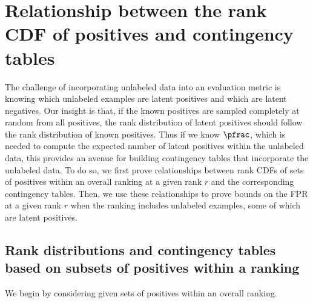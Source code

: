 \section{Relationship between the rank CDF of positives and contingency tables} \label{rank-roc}
The challenge of incorporating unlabeled data into an evaluation metric is knowing which unlabeled examples are latent positives and which are latent negatives. Our insight is that, if the known positives are sampled completely at random from all positives, the rank distribution of latent positives should follow the rank distribution of known positives. Thus if we know $\pfrac$, which is needed to compute the expected number of latent positives within the unlabeled data, this provides an avenue for building contingency tables that incorporate the unlabeled data. To do so, we first prove relationships between rank CDFs of sets of positives within an overall ranking at a given rank $r$ and the corresponding contingency tables. Then, we use these relationships to prove bounds on the FPR at a given rank $r$ when the ranking includes unlabeled examples, some of which are latent positives. 




\subsection{Rank distributions and contingency tables based on subsets of positives within a ranking}
We begin by considering given sets of positives within an overall ranking. %

